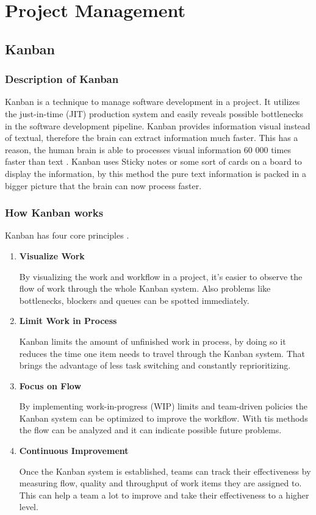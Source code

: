 \chapter{Project Management}
\label{ch:Project Management}

\section{Kanban}

\subsection{Description of Kanban}
Kanban is a technique to manage software development in a project. It utilizes the just-in-time (JIT) production system and easily reveals possible bottlenecks in the software development pipeline. Kanban provides information visual instead of textual, therefore the brain can extract information much faster. This has a reason, the human brain is able to processes visual information 60 000 times faster than text \cite{WhatIsKanban}. Kanban uses Sticky notes or some sort of cards on a board to display the information, by this method the pure text information is packed in a bigger picture that the brain can now process faster.

\subsection{How Kanban works}
Kanban has four core principles \cite{WhatIsKanban}.
\begin{enumerate}
    \item \textbf{Visualize Work}

    By visualizing the work and workflow in a project, it's easier to observe the flow of work through the whole Kanban system. Also problems like bottlenecks, blockers and queues can be spotted immediately.

    \item \textbf{Limit Work in Process}

    Kanban limits the amount of unfinished work in process, by doing so it reduces the time one item needs to travel through the Kanban system. That brings the advantage of less task switching and constantly reprioritizing.

    \item \textbf{Focus on Flow}

    By implementing work-in-progress (WIP) limits and team-driven policies the Kanban system can be optimized to improve the workflow. With tis methods the flow can be analyzed and it can indicate possible future problems.

    \item \textbf{Continuous Improvement}

    Once the Kanban system is established, teams can track their effectiveness by measuring flow, quality and throughput of work items they are assigned to. This can help a team a lot to improve and take their effectiveness to a higher level.
\end{enumerate}

